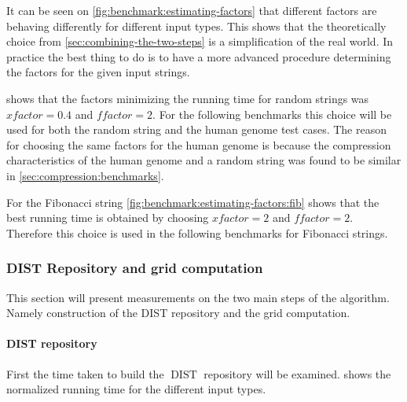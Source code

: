 \documentclass[twoside,11pt,openright]{report}
\newcommand{\DIST}{\operatorname{DIST}}
\newcommand{\xfactor}{\ensuremath{\mathit{xfactor}}}
\newcommand{\ffactor}{\ensuremath{\mathit{ffactor}}}
\begin{document}
It can be seen on \cref{fig:benchmark:estimating-factors} that different factors are behaving differently for different input types. This shows that the theoretically choice from \cref{sec:combining-the-two-steps} is a simplification of the real world. In practice the best thing to do is to have a more advanced procedure determining the factors for the given input strings.

 shows that the factors minimizing the running time for random strings was $\xfactor = 0.4$ and $\ffactor = 2$. For the following benchmarks this choice will be used for both the random string and the human genome test cases. The reason for choosing the same factors for the human genome is because the compression characteristics of the human genome and a random string was found to be similar in \cref{sec:compression:benchmarks}.

For the Fibonacci string \cref{fig:benchmark:estimating-factors:fib} shows that the best running time is obtained by choosing $\xfactor = 2$ and $\ffactor = 2$. Therefore this choice is used in the following benchmarks for Fibonacci strings.

\clearpage
\subsubsection{DIST Repository and grid computation}
This section will present measurements on the two main steps of the algorithm. Namely construction of the DIST repository and the grid computation.

\paragraph{DIST repository}
First the time taken to build the $\DIST$ repository will be examined.  shows the normalized running time for the different input types.

\end{document}
